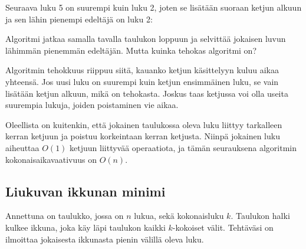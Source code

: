 Seuraava luku 5 on suurempi kuin luku 2,
joten se lisätään suoraan ketjun alkuun ja
sen lähin pienempi edeltäjä on luku 2:

\begin{center}
\end{center}

Algoritmi jatkaa samalla tavalla taulukon loppuun
ja selvittää jokaisen luvun lähimmän
pienemmän edeltäjän.
Mutta kuinka tehokas algoritmi on?

Algoritmin tehokkuus riippuu siitä,
kauanko ketjun käsittelyyn kuluu aikaa yhteensä.
Jos uusi luku on suurempi kuin ketjun ensimmäinen
luku, se vain lisätään ketjun alkuun,
mikä on tehokasta.
Joskus taas ketjussa voi olla useita
suurempia lukuja, joiden poistaminen vie aikaa.

Oleellista on kuitenkin, että jokainen
taulukossa oleva luku liittyy
tarkalleen kerran ketjuun ja poistuu
korkeintaan kerran ketjusta.
Niinpä jokainen luku aiheuttaa $O(1)$
ketjuun liittyvää operaatiota, ja tämän
seurauksena algoritmin kokonaisaikavaativuus on $O(n)$.


\subsection{Liukuvan ikkunan minimi}

\begin{task}
Annettuna on taulukko, jossa on $n$ lukua,
sekä kokonaisluku $k$.
Taulukon halki kulkee ikkuna, joka käy
läpi taulukon kaikki $k$-kokoiset välit.
Tehtäväsi on ilmoittaa jokaisesta ikkunasta
pienin välillä oleva luku.
\end{task}

